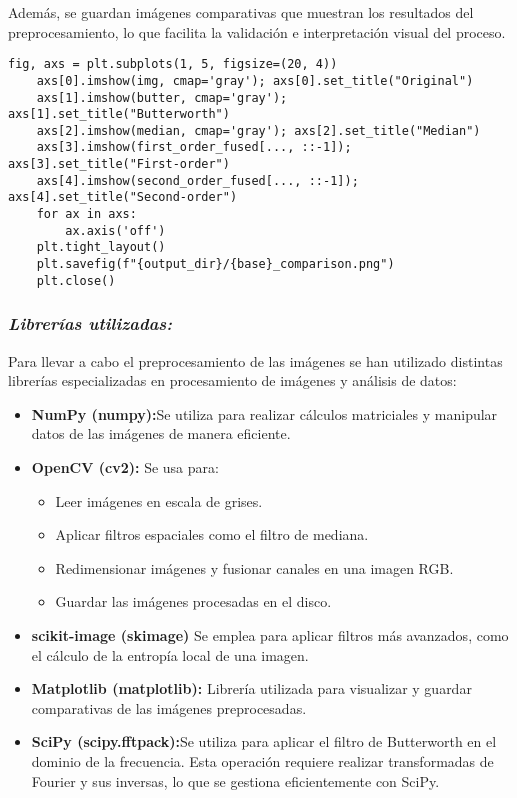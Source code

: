 \documentclass[12pt]{article}
\begin{document}
Además, se guardan imágenes comparativas que muestran los resultados del preprocesamiento, lo que facilita la validación e interpretación visual del proceso.
\begin{lstlisting}[caption={Guardado de comparativas visuales del preprocesamiento}, label=lst:comparativa]
    fig, axs = plt.subplots(1, 5, figsize=(20, 4))
    axs[0].imshow(img, cmap='gray'); axs[0].set_title("Original")
    axs[1].imshow(butter, cmap='gray'); axs[1].set_title("Butterworth")
    axs[2].imshow(median, cmap='gray'); axs[2].set_title("Median")
    axs[3].imshow(first_order_fused[..., ::-1]); axs[3].set_title("First-order")
    axs[4].imshow(second_order_fused[..., ::-1]); axs[4].set_title("Second-order")
    for ax in axs:
        ax.axis('off')
    plt.tight_layout()
    plt.savefig(f"{output_dir}/{base}_comparison.png")
    plt.close()
\end{lstlisting}
\subsubsection{\textit{Librerías utilizadas:}}
Para llevar a cabo el preprocesamiento de las imágenes se han utilizado distintas librerías especializadas en procesamiento de imágenes y análisis de datos:
\begin{itemize}
    \item \textbf{NumPy (numpy):}Se utiliza para realizar cálculos matriciales y manipular datos de las imágenes de manera eficiente.
    \item \textbf{OpenCV (cv2):} Se usa para: \begin{itemize} \item Leer imágenes en escala de grises. \item Aplicar filtros espaciales como el filtro de mediana. \item Redimensionar imágenes y fusionar canales en una imagen RGB. \item Guardar las imágenes procesadas en el disco. \end{itemize}
     \item \textbf{ scikit-image (skimage)} Se emplea para aplicar filtros más avanzados, como el cálculo de la entropía local de una imagen.
    \item \textbf{ Matplotlib (matplotlib):} Librería utilizada para visualizar y guardar comparativas de las imágenes preprocesadas.
     \item \textbf{ SciPy (scipy.fftpack):}Se utiliza para aplicar el filtro de Butterworth en el dominio de la frecuencia. Esta operación requiere realizar transformadas de Fourier y sus inversas, lo que se gestiona eficientemente con SciPy.
\end{itemize}
\end{document}

